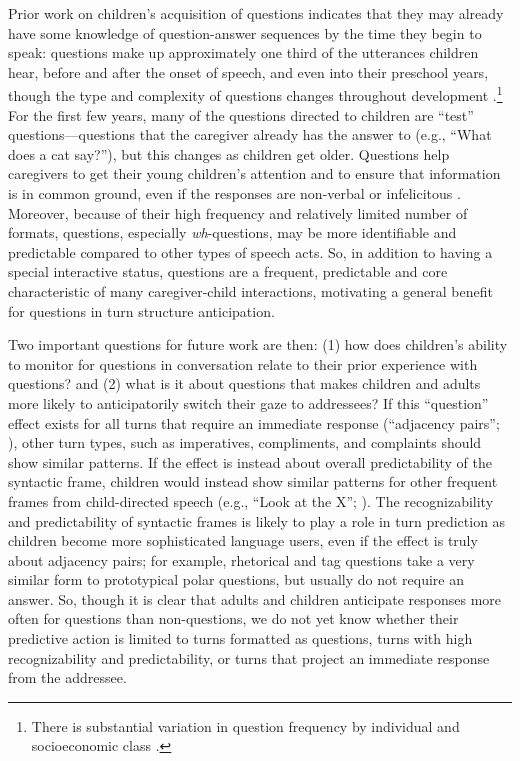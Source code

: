 \documentclass[authoryear, 12pt]{elsarticle}
\begin{document}
Prior work on children's acquisition of questions indicates that they may already have some knowledge of question-answer sequences by the time they begin to speak: questions make up approximately one third of the utterances children hear, before and after the onset of speech, and even into their preschool years, though the type and complexity of questions changes throughout development \citep{casillas2016, fitneva2012, henning2005, shatz1979}.\footnote{There is substantial variation in question frequency by individual and socioeconomic class \citep{hart1992, weisleder2012}.} For the first few years, many of the questions directed to children are ``test'' questions---questions that the caregiver already has the answer to (e.g., ``What does a cat say?''), but this changes as children get older. Questions help caregivers to get their young children's attention and to ensure that information is in common ground, even if the responses are non-verbal or infelicitous \citep{bruner1985, fitneva2012, snow1977}. Moreover, because of their high frequency and relatively limited number of formats, questions, especially \textit{wh}-questions, may be more identifiable and predictable compared to other types of speech acts. So, in addition to having a special interactive status, questions are a frequent, predictable and core characteristic of many caregiver-child interactions, motivating a general benefit for questions in turn structure anticipation.

Two important questions for future work are then: (1) how does children's ability to monitor for questions in conversation relate to their prior experience with questions? and (2) what is it about questions that makes children and adults more likely to anticipatorily switch their gaze to addressees? If this ``question'' effect exists for all turns that require an immediate response (``adjacency pairs''; \citealp{schegloff2007}), other turn types, such as imperatives, compliments, and complaints should show similar patterns. If the effect is instead about overall predictability of the syntactic frame, children would instead show similar patterns for other frequent frames from child-directed speech (e.g., ``Look at the X''; \citealp{mintz2003}). The recognizability and predictability of syntactic frames is likely to play a role in turn prediction as children become more sophisticated language users, even if the effect is truly about adjacency pairs; for example, rhetorical and tag questions take a very similar form to prototypical polar questions, but usually do not require an answer. So, though it is clear that adults and children anticipate responses more often for questions than non-questions, we do not yet know whether their predictive action is limited to turns formatted as questions, turns with high recognizability and predictability, or turns that project an immediate response from the addressee.
\end{document}

